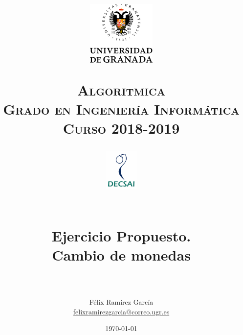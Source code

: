 
\usepackage{url}

\title{	
	\normalfont \normalsize
	\begin{figure}[htb]
		\centering
		\includegraphics[width=0.3\textwidth]{./imagenes/1}
	\end{figure}
	\textsc{\textbf{Algoritmica} \\ Grado en Ingeniería Informática \\ 
	Curso 2018-2019} \\ [25pt] 
	\begin{figure}[htb]
		\centering
		\includegraphics[width=0.15\textwidth]{./imagenes/2}
	\end{figure}
	\horrule{0.5pt} \\[0.4cm]
	\huge Ejercicio Propuesto. \\
	\huge Cambio de monedas
	\\ 
	\horrule{2pt} \\[0.5cm] 
}
\author{Félix Ramírez García  \\
\href{mailto:felixramirezgarcia@correo.ugr.es}{felixramirezgarcia@correo.ugr.es}}
\date{\normalsize\today} 



	
	\maketitle %
	
	\newpage %
	
	\tableofcontents %
	
	\listoffigures %
	
